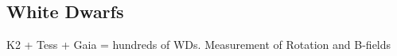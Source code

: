 {\color{red} \subsection{White Dwarfs}}
K2 + Tess + Gaia = hundreds of WDs. Measurement of Rotation and B-fields 